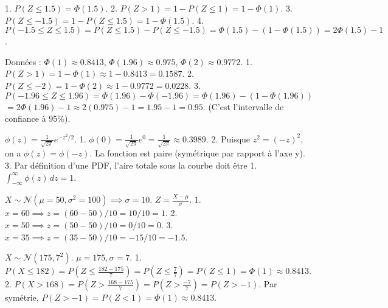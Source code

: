 
\begin{correctionbox}
1.  $P(Z \le 1.5) = \Phi(1.5)$.
2.  $P(Z > 1) = 1 - P(Z \le 1) = 1 - \Phi(1)$.
3.  $P(Z \le -1.5) = 1 - P(Z \le 1.5) = 1 - \Phi(1.5)$.
4.  $P(-1.5 \le Z \le 1.5) = P(Z \le 1.5) - P(Z \le -1.5) = \Phi(1.5) - (1 - \Phi(1.5)) = 2\Phi(1.5) - 1$.
\end{correctionbox}

\begin{correctionbox}
Données : $\Phi(1) \approx 0.8413$, $\Phi(1.96) \approx 0.975$, $\Phi(2) \approx 0.9772$.
1.  $P(Z > 1) = 1 - \Phi(1) \approx 1 - 0.8413 = 0.1587$.
2.  $P(Z \le -2) = 1 - \Phi(2) \approx 1 - 0.9772 = 0.0228$.
3.  $P(-1.96 \le Z \le 1.96) = \Phi(1.96) - \Phi(-1.96) = \Phi(1.96) - (1 - \Phi(1.96))$
    $= 2\Phi(1.96) - 1 \approx 2(0.975) - 1 = 1.95 - 1 = 0.95$.
    (C'est l'intervalle de confiance à 95\%).
\end{correctionbox}

\begin{correctionbox}
$\phi(z) = \frac{1}{\sqrt{2\pi}} e^{-z^2/2}$.
1.  $\phi(0) = \frac{1}{\sqrt{2\pi}} e^{0} = \frac{1}{\sqrt{2\pi}} \approx 0.3989$.
2.  Puisque $z^2 = (-z)^2$, on a $\phi(z) = \phi(-z)$. La fonction est paire (symétrique par rapport à l'axe y).
3.  Par définition d'une PDF, l'aire totale sous la courbe doit être 1. $\int_{-\infty}^{\infty} \phi(z) \, dz = 1$.
\end{correctionbox}


\begin{correctionbox}
$X \sim \mathcal{N}(\mu=50, \sigma^2=100) \implies \sigma=10$.
$Z = \frac{X - \mu}{\sigma}$.
1.  $x = 60 \implies z = (60 - 50) / 10 = 10 / 10 = 1$.
2.  $x = 50 \implies z = (50 - 50) / 10 = 0 / 10 = 0$.
3.  $x = 35 \implies z = (35 - 50) / 10 = -15 / 10 = -1.5$.
\end{correctionbox}

\begin{correctionbox}
$X \sim \mathcal{N}(175, 7^2)$. $\mu=175, \sigma=7$.
1.  $P(X \le 182) = P\left(Z \le \frac{182 - 175}{7}\right) = P(Z \le \frac{7}{7}) = P(Z \le 1) = \Phi(1) \approx 0.8413$.
2.  $P(X > 168) = P\left(Z > \frac{168 - 175}{7}\right) = P(Z > \frac{-7}{7}) = P(Z > -1)$.
    Par symétrie, $P(Z > -1) = P(Z < 1) = \Phi(1) \approx 0.8413$.
\end{correctionbox}

